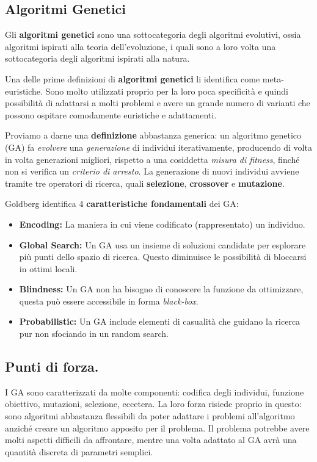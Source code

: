    \subsection{Algoritmi Genetici}
        Gli \textbf{algoritmi genetici} sono una sottocategoria degli algoritmi evolutivi, ossia algoritmi ispirati alla teoria dell'evoluzione, i quali sono a loro volta una sottocategoria degli algoritmi ispirati alla natura.
        
        Una delle prime definizioni di \textbf{algoritmi genetici} li identifica come meta-euristiche. Sono molto utilizzati proprio per la loro poca specificità e quindi possibilità di adattarsi a molti problemi e avere un grande numero di varianti che possono ospitare comodamente euristiche e adattamenti.
        
        Proviamo a darne una \textbf{definizione} abbastanza generica: un algoritmo genetico (GA) fa \textit{evolvere} una \textit{generazione} di individui iterativamente, producendo di volta in volta generazioni migliori, rispetto a una cosiddetta \textit{misura di fitness}, finché non si verifica un \textit{criterio di arresto}. La generazione di nuovi individui avviene tramite tre operatori di ricerca, quali \textbf{selezione}, \textbf{crossover} e \textbf{mutazione}.
        
        Goldberg identifica 4 \textbf{caratteristiche fondamentali} dei GA:
        \begin{itemize}
            \item \textbf{Encoding:} La maniera in cui viene codificato (rappresentato) un individuo.
            \item \textbf{Global Search:} Un GA usa un insieme di soluzioni candidate per esplorare più punti dello spazio di ricerca. Questo diminuisce le possibilità di bloccarsi in ottimi locali.
            \item \textbf{Blindness:} Un GA non ha bisogno di conoscere la funzione da ottimizzare, questa può essere accessibile in forma \textit{black-box}.
            \item \textbf{Probabilistic:} Un GA include elementi di casualità che guidano la ricerca pur non sfociando in un random search.
        \end{itemize}
        
        \subsection{Punti di forza.}
            I GA sono caratterizzati da molte componenti: codifica degli individui, funzione obiettivo, mutazioni, selezione, eccetera. La loro forza risiede proprio in questo: sono algoritmi abbastanza flessibili da poter adattare i problemi all'algoritmo anziché creare un algoritmo apposito per il problema. Il problema potrebbe avere molti aspetti difficili da affrontare, mentre una volta adattato al GA avrà una quantità discreta di parametri semplici.
            
